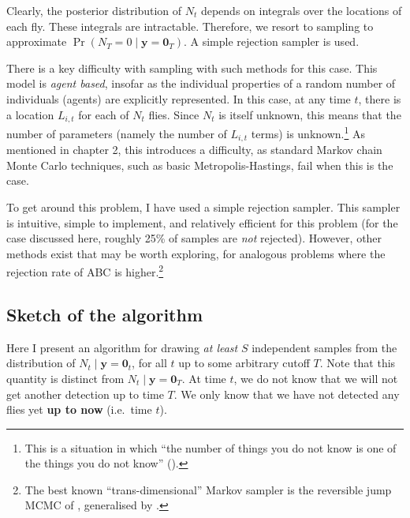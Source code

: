 \documentclass[
  oneside]{book}
\begin{document}
Clearly, the posterior distribution of \(N_t\) depends on integrals over the locations of each fly. These integrals are intractable. Therefore, we resort to sampling to approximate \(\Pr(N_T = 0 \mid \mathbf y = \mathbf 0_T)\). A simple rejection sampler is used.

There is a key difficulty with sampling with such methods for this case. This model is \emph{agent based}, insofar as the individual properties of a random number of individuals (agents) are explicitly represented. In this case, at any time \(t\), there is a location \(L_{i,t}\) for each of \(N_t\) flies. Since \(N_t\) is itself unknown, this means that the number of parameters (namely the number of \(L_{i, t}\) terms) is unknown.\footnote{This is a situation in which ``the number of things you do not know is one of the things you do not know'' (\citet{richardson1997bayesian}).} As mentioned in chapter 2, this introduces a difficulty, as standard Markov chain Monte Carlo techniques, such as basic Metropolis-Hastings, fail when this is the case.

To get around this problem, I have used a simple rejection sampler. This sampler is intuitive, simple to implement, and relatively efficient for this problem (for the case discussed here, roughly 25\% of samples are \emph{not} rejected). However, other methods exist that may be worth exploring, for analogous problems where the rejection rate of ABC is higher.\footnote{The best known ``trans-dimensional'' Markov sampler is the reversible jump MCMC of \citet{green1995}, generalised by \citet{keith2004}.}

\hypertarget{sketch-of-the-algorithm}{%
\subsection{Sketch of the algorithm}\label{sketch-of-the-algorithm}}

Here I present an algorithm for drawing \emph{at least} \(S\) independent samples from the distribution of \(N_t \mid \mathbf y = \mathbf 0_t\), for all \(t\) up to some arbitrary cutoff \(T\). Note that this quantity is distinct from \(N_t \mid \mathbf y = \mathbf 0_T\). At time \(t\), we do not know that we will not get another detection up to time \(T\). We only know that we have not detected any flies yet \textbf{up to now} (i.e.~time \(t\)).
\end{document}
